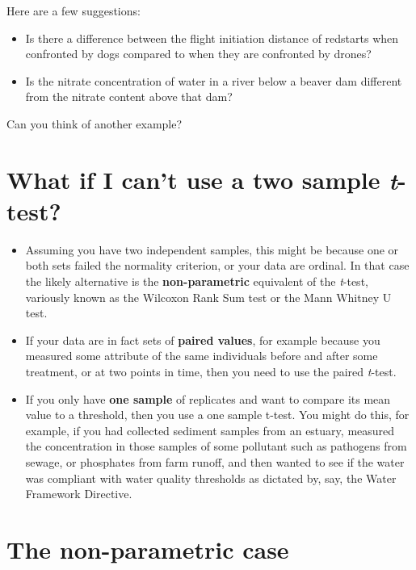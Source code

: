 \documentclass[
  letterpaper,
  DIV=11,
  numbers=noendperiod]{scrreprt}
\begin{document}
Here are a few suggestions:

\begin{itemize}
\item
  Is there a difference between the flight initiation distance of
  redstarts when confronted by dogs compared to when they are confronted
  by drones?
\item
  Is the nitrate concentration of water in a river below a beaver dam
  different from the nitrate content above that dam?
\end{itemize}

Can you think of another example?

\section{\texorpdfstring{What if I can't use a two sample
\emph{t}-test?}{What if I can't use a two sample t-test?}}\label{what-if-i-cant-use-a-two-sample-t-test}

\begin{itemize}
\item
  Assuming you have two independent samples, this might be because one
  or both sets failed the normality criterion, or your data are ordinal.
  In that case the likely alternative is the \textbf{non-parametric}
  equivalent of the \emph{t}-test, variously known as the Wilcoxon Rank
  Sum test or the Mann Whitney U test.
\item
  If your data are in fact sets of \textbf{paired values}, for example
  because you measured some attribute of the same individuals before and
  after some treatment, or at two points in time, then you need to use
  the paired \emph{t}-test.
\item
  If you only have \textbf{one sample} of replicates and want to compare
  its mean value to a threshold, then you use a one sample t-test. You
  might do this, for example, if you had collected sediment samples from
  an estuary, measured the concentration in those samples of some
  pollutant such as pathogens from sewage, or phosphates from farm
  runoff, and then wanted to see if the water was compliant with water
  quality thresholds as dictated by, say, the Water Framework Directive.
\end{itemize}

\section{The non-parametric case}\label{the-non-parametric-case}
\end{document}
